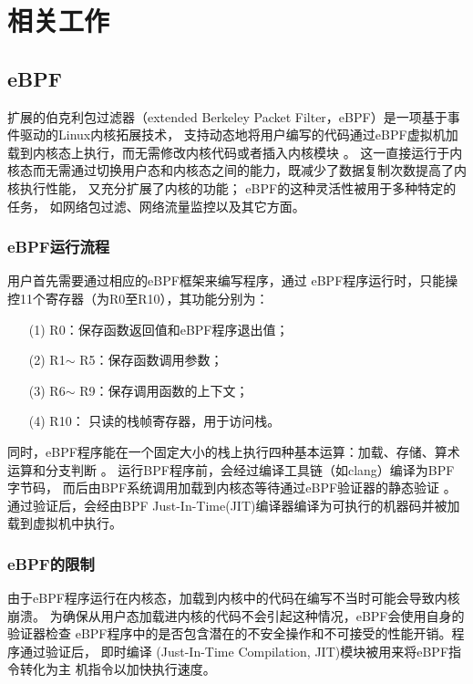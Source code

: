 \section{相关工作}
\label{section:relatedWork}
\subsection{eBPF}
    扩展的伯克利包过滤器（extended Berkeley Packet Filter，eBPF）是一项基于事件驱动的Linux内核拓展技术，
    支持动态地将用户编写的代码通过eBPF虚拟机加载到内核态上执行，而无需修改内核代码或者插入内核模块
    \cite{sunFindingCorrectnessBugs2024, YIHeCrossContainer, riceLearningEBPFProgramming2023}。
    这一直接运行于内核态而无需通过切换用户态和内核态之间的能力，既减少了数据复制次数提高了内核执行性能，
    又充分扩展了内核的功能\cite{YIHeCrossContainer, ZhangZiJunLinuxXiTonge}；
    eBPF的这种灵活性被用于多种特定的任务\cite{HaoValidating}，
    如网络包过滤\cite{10.1145/3371038, TCPdump}、网络流量监控\cite{9110434}以及其它方面\cite{280870, 258973}。

    \subsubsection{eBPF运行流程}
        用户首先需要通过相应的eBPF框架来编写程序，通过\cite{riceLearningEBPFProgramming2023}
        eBPF程序运行时，只能操控11个寄存器（为R0至R10），其功能分别为：
        \begin{itemize}
            \item[(1)] R0：保存函数返回值和eBPF程序退出值；
            \item[(2)] R1$\sim$ R5：保存函数调用参数；
            \item[(3)] R6$\sim$ R9：保存调用函数的上下文；
            \item[(4)] R10： 只读的栈帧寄存器，用于访问栈。
        \end{itemize}

        同时，eBPF程序能在一个固定大小的栈上执行四种基本运算：加载、存储、算术运算和分支判断
        \cite{HaoValidating}。\nolinebreak
        运行BPF程序前，会经过编译工具链（如clang）编译为BPF字节码，
        而后由BPF系统调用加载到内核态等待通过eBPF验证器的静态验证
        \cite{zhengBpftimeUserspaceEBPF2023}。\nolinebreak
        通过验证后，会经由BPF Just-In-Time(JIT)编译器编译为可执行的机器码并被加载到虚拟机中执行。

    \subsubsection{eBPF的限制}
        由于eBPF程序运行在内核态，加载到内核中的代码在编写不当时可能会导致内核崩溃。
        为确保从用户态加载进内核的代码不会引起这种情况，eBPF会使用自身的验证器检查
        eBPF程序中的是否包含潜在的不安全操作和不可接受的性能开销。程序通过验证后，
        即时编译 (Just-In-Time Compilation, JIT)模块被用来将eBPF指令转化为主
        机指令以加快执行速度\cite{FuzzOnEBPF}。

